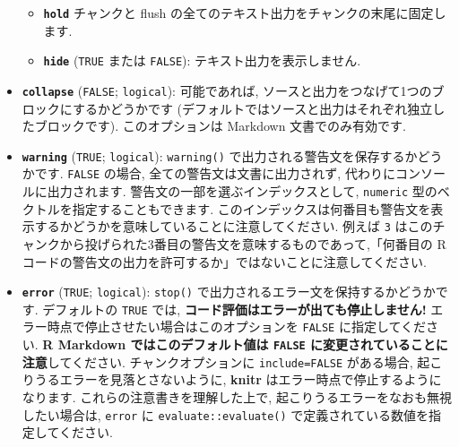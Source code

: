 \documentclass[
  lualatex,ja=standard,jafont=noto-otf]{bxjsreport}
\providecommand{\tightlist}{%
  \setlength{\itemsep}{0pt}\setlength{\parskip}{0pt}}
\begin{document}
\begin{itemize}
  \begin{itemize}
  \tightlist
  \item
    \textbf{\texttt{hold}} チャンクと flush
    の全てのテキスト出力をチャンクの末尾に固定します.
  \item
    \textbf{\texttt{hide}} (\texttt{TRUE} または \texttt{FALSE}):
    テキスト出力を表示しません.
  \end{itemize}
\item
  \textbf{\texttt{collapse}} (\texttt{FALSE}; \texttt{logical}):
  可能であれば, ソースと出力をつなげて1つのブロックにするかどうかです
  (デフォルトではソースと出力はそれぞれ独立したブロックです).
  このオプションは Markdown 文書でのみ有効です.
\item
  \textbf{\texttt{warning}} (\texttt{TRUE}; \texttt{logical}):
  \texttt{warning()} で出力される警告文を保存するかどうかです.
  \texttt{FALSE} の場合, 全ての警告文は文書に出力されず,
  代わりにコンソールに出力されます.
  警告文の一部を選ぶインデックスとして, \texttt{numeric}
  型のベクトルを指定することもできます.
  このインデックスは何番目も警告文を表示するかどうかを意味していることに注意してください.
  例えば \texttt{3}
  はこのチャンクから投げられた3番目の警告文を意味するものであって,「何番目の
  R コードの警告文の出力を許可するか」ではないことに注意してください.
\item
  \textbf{\texttt{error}} (\texttt{TRUE}; \texttt{logical}):
  \texttt{stop()} で出力されるエラー文を保持するかどうかです.
  デフォルトの \texttt{TRUE} では,
  \textbf{コード評価はエラーが出ても停止しません!}
  エラー時点で停止させたい場合はこのオプションを \texttt{FALSE}
  に指定してください. \textbf{R Markdown ではこのデフォルト値は
  \texttt{FALSE} に変更されていることに注意}してください.
  チャンクオプションに \texttt{include=FALSE} がある場合,
  起こりうるエラーを見落とさないように, \textbf{knitr}
  はエラー時点で停止するようになります. これらの注意書きを理解した上で,
  起こりうるエラーをなおも無視したい場合は, \texttt{error} に
  \texttt{evaluate::evaluate()} で定義されている数値を指定してください.


\end{itemize}
\end{document}
